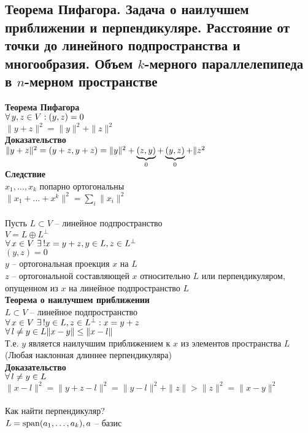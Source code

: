 \documentclass[12pt]{article}
\begin{document}
\subsection{Теорема Пифагора. Задача о наилучшем приближении и перпендикуляре. Расстояние от точки до линейного подпространства и многообразия. Объем $k$-мерного параллелепипеда в $n$-мерном пространстве}
\textbf{Теорема Пифагора}\\
$\fall y,z \in V: (y, z) = 0$\\
$\|y+z\|^2 = \|y\|^2 + \|z\|^2$\\
\textbf{Доказательство}\\
$\|y+z\|^2 = (y+z, y+z) = \|y\|^2 + \ub0{(z,y)} + \ub0{(y,z)} + \|z\\^2$\\
\textbf{Следствие}\\
$x_1, \ldots, x_k$ попарно ортогональны\\
$\|x_1 + \ldots + x^k\|^2 = \sum_i \|x_i\|^2$\\\\
Пусть $L \subset V$ -- линейное подпространство\\
$V = L \oplus L^\perp$\\
$\fall x \in V\ \ex! x=y+z, y\in L, z \in L^\perp$\\
$(y,z) = 0$\\
$y$ -- ортогональная проекция $x$ на $L$\\
$z$ -- ортогональной составляющей $x$ относительно $L$ или перпендикуляром, опущенном из $x$ на линейное подпространство $L$\\
\textbf{Теорема о наилучшем приближении}\\
$L \subset V$ -- линейное подпространство\\
$\fall x \in V\ \ex! y\in L, z \in L^\perp: x = y+z$\\
$\fall l\neq y \in L \|x-y\|\leq \|x-l\|$\\
Т.е. $y$ является наилучшим приближением к $x$ из элементов пространства $L$\\
(Любая наклонная длиннее перпендикуляра)\\
\textbf{Доказательство}\\
$\fall l \neq y \in L$\\
$\| x - l \|^2 = \|y + z - l\|^2 = \|y-l\|^2 + \|z\| > \|z\|^2 = \|x-y\|^2$\\\\
Как найти перпендикуляр?\\
$L = \span(a_1, \ldots, a_k), a$ -- базис\\
\end{document}
